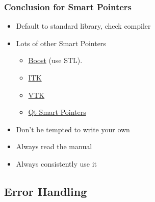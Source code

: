 \begin{Shaded}
\begin{Highlighting}[]
 
\NormalTok{\{}
\NormalTok{:}
   
   
\NormalTok{:}
   
\NormalTok{\};}

 
\NormalTok{\{}
\NormalTok{\}}

 
\NormalTok{\{}
\NormalTok{\}}

\end{Highlighting}
\end{Shaded}

\subsubsection{Conclusion for Smart
Pointers}\label{conclusion-for-smart-pointers}

\begin{itemize}
\itemsep1pt\parskip0pt
\item
  Default to standard library, check compiler
\item
  Lots of other Smart Pointers

  \begin{itemize}
  \itemsep1pt\parskip0pt
  \item
    \href{http://www.boost.org}{Boost} (use STL).
  \item
    \href{http://www.itk.org}{ITK}
  \item
    \href{http://www.vtk.org/Wiki/VTK/Tutorials/SmartPointers}{VTK}
  \item
    \href{https://wiki.qt.io/Smart_Pointers}{Qt Smart Pointers}
  \end{itemize}
\item
  Don't be tempted to write your own
\item
  Always read the manual
\item
  Always consistently use it
\end{itemize}

\subsection{Error Handling}\label{error-handling}

